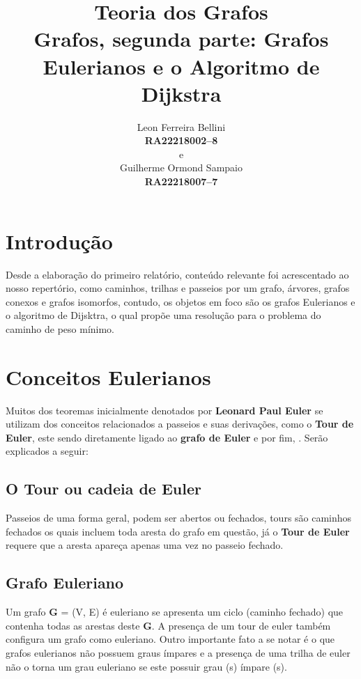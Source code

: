 \documentclass[a4paper, 12pt]{article}
\begin{document}
\title{\textbf{Teoria dos Grafos}\\ \small{Grafos, segunda parte: Grafos Eulerianos e o Algoritmo de Dijkstra}}
\author{Leon Ferreira Bellini\\
	\small{\textbf{RA\@ 22218002--8}}\\
	e\\
   Guilherme Ormond Sampaio\\
   \small{\textbf{RA\@ 22218007--7}}
}
\date{}
\maketitle
\section{Introdução}
Desde a elaboração do primeiro relatório, conteúdo relevante foi acrescentado ao nosso repertório, como caminhos, trilhas e passeios por um grafo, árvores, grafos conexos e grafos isomorfos, contudo, os objetos em foco são os grafos Eulerianos e o algoritmo de Dijsktra, o qual propõe uma resolução para o problema do caminho de peso mínimo.

\section{Conceitos Eulerianos}
Muitos dos teoremas inicialmente denotados por \textbf{Leonard Paul Euler} se utilizam dos conceitos relacionados a passeios e suas derivações, como o \textbf{Tour de Euler}, este sendo diretamente ligado ao \textbf{grafo de Euler} e por fim,  . Serão explicados a seguir:

\subsection{O Tour ou cadeia de Euler}
Passeios de uma forma geral, podem ser abertos ou fechados, tours são caminhos fechados os quais incluem toda aresta do grafo em questão, já o \textbf{Tour de Euler} requere que a aresta apareça apenas uma vez no passeio fechado.

\subsection{Grafo Euleriano}

Um grafo \textbf{G} = (V, E) é euleriano se apresenta um ciclo (caminho fechado) que contenha todas as arestas deste \textbf{G}. A presença de um tour de euler também configura um grafo como euleriano. Outro importante fato a se notar é o que grafos eulerianos não possuem graus ímpares e a presença de uma trilha de euler não o torna um grau euleriano se este possuir grau (s) ímpare (s). 
\end{document}
